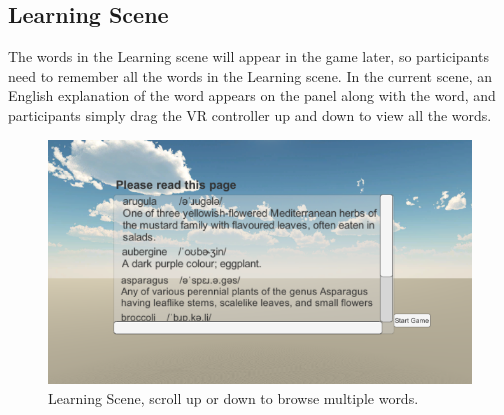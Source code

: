 \documentclass{vgtc}                          %
\begin{document}
\subsection{Learning Scene}
The words in the Learning scene will appear in the game later, so participants need to remember all the words in the Learning scene.  In the current scene, an English explanation of the word appears on the panel along with the word, and participants simply drag the VR controller up and down to view all the words. 
\begin{figure}[H]
 \centering 
 \includegraphics[width=\columnwidth]{pictures/LearningScene.png}
 \caption{Learning Scene, scroll up or down to browse multiple words.}
   \label{fig:learning}
\end{figure}
\end{document}
